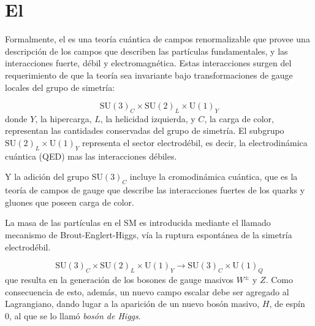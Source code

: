 \section{El \SM}

Formalmente, el {\SM} es una teoría cuántica de campos renormalizable que provee
una descripción de los campos que describen las partículas fundamentales, y las
interacciones fuerte, débil y electromagnética.
Estas interacciones surgen del requerimiento de que la teoría sea invariante
bajo transformaciones de gauge locales del grupo de simetría:

\begin{equation}
  \text{SU}(3)_C \times \text{SU}(2)_L \times \text{U}(1)_Y
\end{equation}
%
donde $Y$, la hipercarga, $L$, la helicidad izquierda, y $C$, la carga de color,
representan las cantidades conservadas del grupo de simetría. El subgrupo
$\text{SU}(2)_L \times \text{U}(1)_Y$ representa el sector electrodébil, es
decir, la electrodinámica cuántica (QED) mas las interacciones débiles.


Y la adición del grupo $\text{SU}(3)_C$ incluye la cromodinámica cuántica, que
es la teoría de campos de gauge que describe las interacciones fuertes de los
quarks y gluones que poseen carga de color.

La masa de las partículas en el SM es introducida mediante el llamado
mecanismo de Brout-Englert-Higgs\cite{PhysRevLett.13.321, PhysRevLett.13.508}, vía la ruptura
espontánea de la simetría electrodébil.

\begin{equation}
  \text{SU}(3)_C \times \text{SU}(2)_L \times \text{U}(1)_Y \to \text{SU}(3)_C
  \times \text{U}(1)_Q
\end{equation}
%
que resulta en la generación de los bosones de gauge masivos $W^\pm$ y $Z$. Como
consecuencia de esto, además, un nuevo campo escalar debe ser agregado al
Lagrangiano, dando lugar a la aparición de un nuevo bosón masivo, $H$, de espín
0, al que se lo llamó \emph{bosón de Higgs}.

